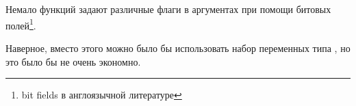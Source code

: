 \chapter{\BitfieldsChapter}
\label{sec:bitfields}

Немало функций задают различные флаги в аргументах при помощи битовых полей\footnote{bit fields в англоязычной литературе}.

Наверное, вместо этого можно было бы использовать набор переменных типа \Tbool, но это было бы 
не очень экономно.








